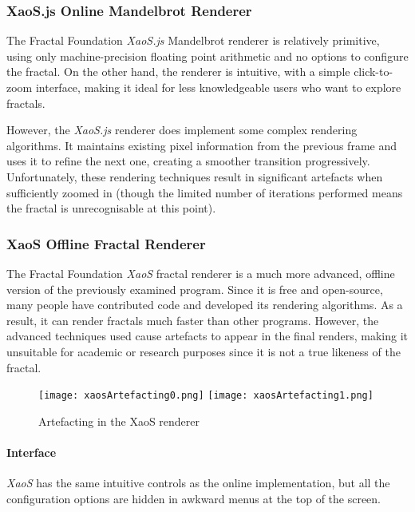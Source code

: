 \subsubsection{XaoS.js Online Mandelbrot Renderer \cite{xaos.js}}

The Fractal Foundation \textit{XaoS.js} Mandelbrot renderer is relatively primitive, using only machine-precision floating point arithmetic and no options to configure the fractal. On the other hand, the renderer is intuitive, with a simple click-to-zoom interface, making it ideal for less knowledgeable users who want to explore fractals.

However, the \textit{XaoS.js} renderer does implement some complex rendering algorithms. It maintains existing pixel information from the previous frame and uses it to refine the next one, creating a smoother transition progressively. Unfortunately, these rendering techniques result in significant artefacts when sufficiently zoomed in (though the limited number of iterations performed means the fractal is unrecognisable at this point).

\subsubsection{XaoS Offline Fractal Renderer \cite{fractalfoundation}}

The Fractal Foundation \textit{XaoS} fractal renderer is a much more advanced, offline version of the previously examined program. Since it is free and open-source, many people have contributed code and developed its rendering algorithms. As a result, it can render fractals much faster than other programs. However, the advanced techniques used cause artefacts to appear in the final renders, making it unsuitable for academic or research purposes since it is not a true likeness of the fractal.

\FloatBarrier

\begin{figure}[htp]
    \centering
    \texttt{[image: xaosArtefacting0.png]}
    \texttt{[image: xaosArtefacting1.png]}
    \caption{Artefacting in the XaoS renderer}
\end{figure}

\FloatBarrier

\paragraph{Interface} \textit{XaoS} has the same intuitive controls as the online implementation, but all the configuration options are hidden in awkward menus at the top of the screen.

